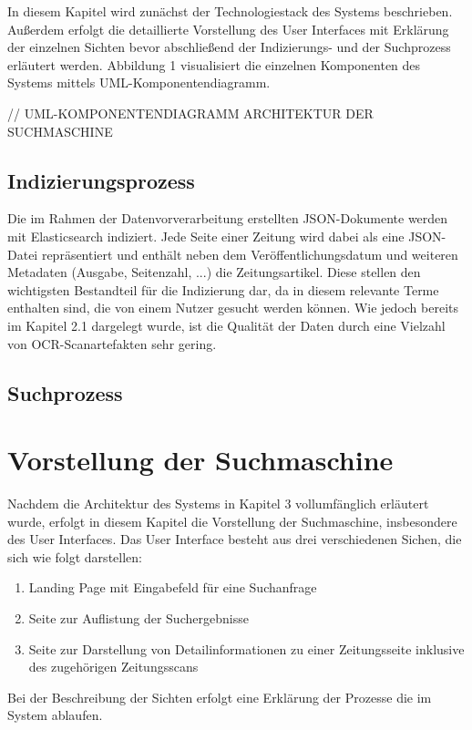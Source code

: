 \documentclass[11pt,a4paper, halfparskip]{scrartcl}
\begin{document}
In diesem Kapitel wird zunächst der Technologiestack des Systems beschrieben. 
Außerdem erfolgt die detaillierte Vorstellung des User Interfaces mit Erklärung der einzelnen Sichten bevor abschließend der Indizierungs- und der Suchprozess erläutert werden.
Abbildung 1 visualisiert die einzelnen Komponenten des Systems mittels UML-Komponentendiagramm. 

// UML-KOMPONENTENDIAGRAMM ARCHITEKTUR DER SUCHMASCHINE 

\subsection{Indizierungsprozess}

Die im Rahmen der Datenvorverarbeitung erstellten JSON-Dokumente werden mit Elasticsearch indiziert. 
Jede Seite einer Zeitung wird dabei als eine JSON-Datei repräsentiert und enthält neben dem Veröffentlichungsdatum und weiteren Metadaten (Ausgabe, Seitenzahl, ...) die Zeitungsartikel.
Diese stellen den wichtigsten Bestandteil für die Indizierung dar, da in diesem relevante Terme enthalten sind, die von einem Nutzer gesucht werden können.
Wie jedoch bereits im Kapitel 2.1 dargelegt wurde, ist die Qualität der Daten durch eine Vielzahl von OCR-Scanartefakten sehr gering.

\subsection{Suchprozess}

\section{Vorstellung der Suchmaschine}

Nachdem die Architektur des Systems in Kapitel 3 vollumfänglich erläutert wurde, erfolgt in diesem Kapitel die Vorstellung der Suchmaschine, insbesondere des User Interfaces.
Das User Interface besteht aus drei verschiedenen Sichen, die sich wie folgt darstellen:
	\begin{enumerate}
		\item Landing Page mit Eingabefeld für eine Suchanfrage
		\item Seite zur Auflistung der Suchergebnisse
		\item Seite zur Darstellung von Detailinformationen zu einer Zeitungsseite inklusive des zugehörigen Zeitungsscans  	
	\end{enumerate}
Bei der Beschreibung der Sichten erfolgt eine Erklärung der Prozesse die im System ablaufen.
\end{document}

